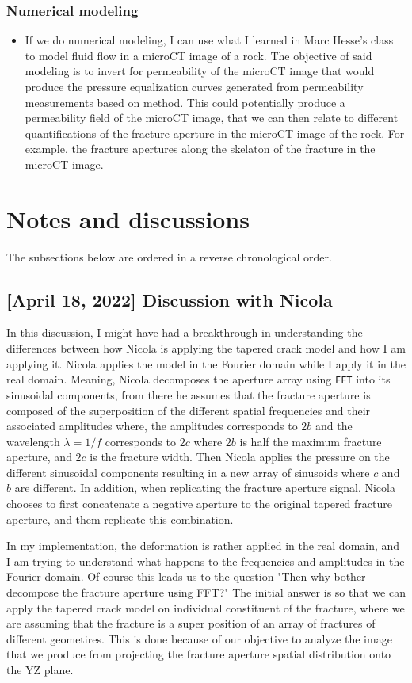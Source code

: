 \documentclass[12pt,titlepage]{article}
\begin{document}
\subsubsection{Numerical modeling}
\begin{itemize}
\item If we do numerical modeling, I can use what I learned in Marc Hesse's class to model fluid flow in a microCT image of a rock. The objective of said modeling is to invert for permeability of the microCT image that would produce the pressure equalization curves generated from permeability measurements based on \citep{Brace1968} method. This could potentially produce a permeability field of the microCT image, that we can then relate to different quantifications of the fracture aperture in the microCT image of the rock. For example, the fracture apertures along the skelaton of the fracture in the microCT image.
\end{itemize}

\section{Notes and discussions}
The subsections below are ordered in a reverse chronological order.
\subsection{[April 18, 2022] Discussion with Nicola}
In this discussion, I might have had a breakthrough in understanding the differences between how Nicola is applying the tapered crack model and how I am applying it. Nicola applies the model in the Fourier domain while I apply it in the real domain. Meaning, Nicola decomposes the aperture array using \texttt{FFT} into its sinusoidal components, from there he assumes that the fracture aperture is composed of the superposition of the different spatial frequencies and their associated amplitudes where, the amplitudes corresponds to $2b$ and the wavelength $\lambda = 1/f$ corresponds to $2c$ where $2b$ is half the maximum fracture aperture, and $2c$ is the fracture width. Then Nicola applies the pressure on the different sinusoidal components resulting in a new array of sinusoids where $c$ and $b$ are different. In addition, when replicating the fracture aperture signal, Nicola chooses to first concatenate a negative aperture to the original tapered fracture aperture, and them replicate this combination.

In my implementation, the deformation is rather applied in the real domain, and I am trying to understand what happens to the frequencies and amplitudes in the Fourier domain. Of course this leads us to the question "Then why bother decompose the fracture aperture using FFT?" The initial answer is so that we can  apply the tapered crack model on individual constituent of the fracture, where we are assuming that the fracture is a super position of an array of fractures of different geometires. This is done because of our objective to analyze the image that we produce from projecting the fracture aperture spatial distribution onto the YZ plane.
\end{document}
